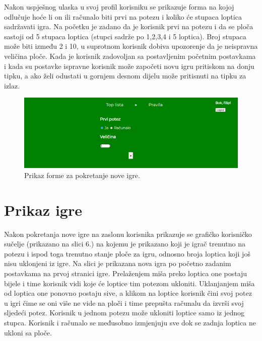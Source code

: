 Nakon uspješnog ulaska u svoj profil korisniku se prikazuje forma na kojoj odlučuje hoće li on ili računalo biti prvi na potezu i koliko će stupaca loptica sadržavati igra. Na početku je zadano da je korisnik prvi na potezu i da se ploča sastoji od 5 stupaca loptica (stupci sadrže po 1,2,3,4 i 5 loptica). Broj stupaca može biti između 2 i 10, u suprotnom korisnik dobiva upozorenje da je neispravna veličina ploče. Kada je korisnik zadovoljan sa postavljenim početnim postavkama i kada su postavke ispravne korisnik može započeti novu igru pritiskom na donju tipku, a ako želi odustati u gornjem desnom dijelu može pritisnuti na tipku za izlaz.

\begin{figure}[H]
\centering
\includegraphics[width=14cm]{slike-program/Slika5.png}
\caption{Prikaz forme za pokretanje nove igre.}
\label{}
\end{figure}


\section{Prikaz igre}

Nakon pokretanja nove igre na zaslonu korisnika prikazuje se grafičko korisničko sučelje (prikazano na slici 6.) na kojemu je prikazano koji je igrač trenutno na potezu i ispod toga trenutno stanje ploče za igru, odnosno broja loptica koji još nisu uklonjeni iz igre. Na slici je prikazana nova igra po početno zadanim postavkama na prvoj stranici igre.  Prelaženjem miša preko loptica one postaju bijele i time korisnik vidi koje će loptice tim potezom ukloniti. Uklanjanjem miša od loptica one ponovno postaju sive, a klikom na loptice korisnik čini svoj potez u igri čime se oni više ne vide na ploči i time prepušta računalu da izvrši svoj sljedeći potez. Korisnik u jednom potezu može ukloniti loptice samo iz jednog stupca. Korisnik i računalo se međusobno izmjenjuju sve dok se zadnja loptica ne ukloni sa ploče.\newline


